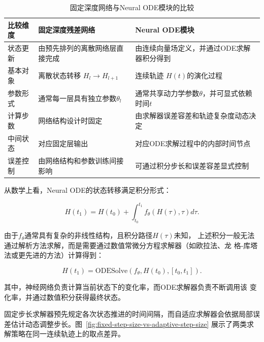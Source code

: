 \begin{table}[htbp]
\centering
\caption{固定深度网络与Neural ODE模块的比较}
\begin{tabular}{p{3cm}p{5cm}p{5cm}}
\hline
比较维度 & 固定深度残差网络 & Neural ODE模块 \\
\hline

状态更新 &
由预先排列的离散网络层直接完成 &
由连续向量场定义，并通过ODE求解器积分得到 \\

基本对象 &
离散状态转移
$H_l\rightarrow H_{l+1}$ &
连续轨迹
$H(t)$的演化过程 \\

参数形式 &
通常每一层具有独立参数$\theta_l$ &
通常共享动力学参数$\theta$，并可显式依赖时间$t$ \\

计算步数 &
网络结构设计时固定 &
由求解器误差容差和轨迹复杂度动态决定 \\

中间状态 &
对应固定层输出 &
对应ODE求解过程中的内部时间节点 \\

误差控制 &
由网络结构和参数训练间接影响 &
可通过积分步长和误差容差显式控制 \\

\hline
\end{tabular}
\end{table}



从数学上看，Neural ODE的状态转移满足积分形式：

\begin{equation}
H(t_1)
=
H(t_0)
+
\int_{t_0}^{t_1}
f_\theta(H(\tau),\tau)d\tau .
\end{equation}

由于$f_\theta$通常具有复杂的非线性结构，且积分路径$H(\tau)$未知，
上述积分一般无法通过解析方法求解，而是需要通过数值常微分方程求解器（如欧拉法、龙
格-库塔法或更先进的方法）计算得到：

\begin{equation}
H(t_1)
=
\mathrm{ODESolve}
(f_\theta,H(t_0),[t_0,t_1]).
\end{equation}

其中，神经网络负责计算当前状态下的变化率，而ODE求解器负责不断调用该
变化率，并通过数值积分获得最终状态。

固定步长求解器预先规定各次状态推进的时间间隔，而自适应求解器会依据局部误差估计动态调整步长。图~\ref{fig:fixed-step-size-vs-adaptive-step-size} 展示了两类求解策略在同一连续轨迹上的取点差异。


